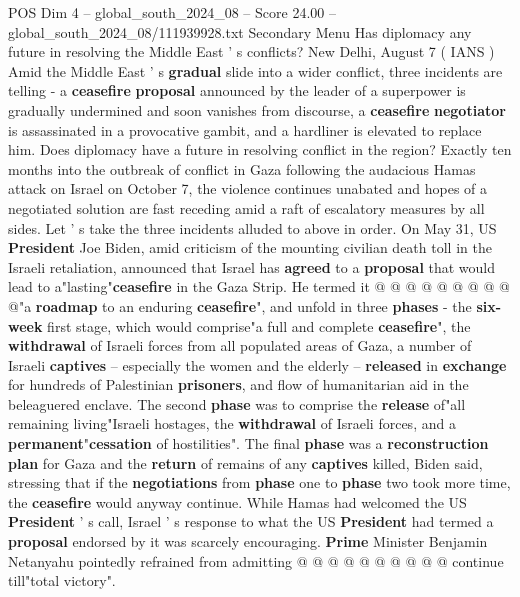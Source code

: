 \begin{textsample}{POS Dim 4 – global\_south\_2024\_08 – Score 24.00 – global\_south\_2024\_08/111939928.txt}  \label{ex:f4_pos_122}
Secondary Menu Has diplomacy any future in resolving the Middle East ' s conflicts?
New Delhi, August 7 ( IANS ) Amid the Middle East ' s \textbf{gradual} slide into a wider conflict, three incidents are telling - a \textbf{ceasefire} \textbf{proposal} announced by the leader of a superpower is gradually undermined and soon vanishes from discourse, a \textbf{ceasefire} \textbf{negotiator} is assassinated in a provocative gambit, and a hardliner is elevated to replace him.
Does diplomacy have a future in resolving conflict in the region?
Exactly ten months into the outbreak of conflict in Gaza following the audacious Hamas attack on Israel on October 7, the violence continues unabated and hopes of a negotiated solution are fast receding amid a raft of escalatory measures by all sides.
Let ' s take the three incidents alluded to above in order.
On May 31, US \textbf{President} Joe Biden, amid criticism of the mounting civilian death toll in the Israeli retaliation, announced that Israel has \textbf{agreed} to a \textbf{proposal} that would lead to a"lasting"\textbf{ceasefire} in the Gaza Strip.
He termed it @ @ @ @ @ @ @ @ @ @"a \textbf{roadmap} to an enduring \textbf{ceasefire}", and unfold in three \textbf{phases} - the \textbf{six-week} first stage, which would comprise"a full and complete \textbf{ceasefire}", the \textbf{withdrawal} of Israeli forces from all populated areas of Gaza, a number of Israeli \textbf{captives} -- especially the women and the elderly -- \textbf{released} in \textbf{exchange} for hundreds of Palestinian \textbf{prisoners}, and flow of humanitarian aid in the beleaguered enclave.
The second \textbf{phase} was to comprise the \textbf{release} of"all remaining living"Israeli hostages, the \textbf{withdrawal} of Israeli forces, and a \textbf{permanent}"\textbf{cessation} of hostilities".
The final \textbf{phase} was a \textbf{reconstruction} \textbf{plan} for Gaza and the \textbf{return} of remains of any \textbf{captives} killed, Biden said, stressing that if the \textbf{negotiations} from \textbf{phase} one to \textbf{phase} two took more time, the \textbf{ceasefire} would anyway continue.
While Hamas had welcomed the US \textbf{President} ' s call, Israel ' s response to what the US \textbf{President} had termed a \textbf{proposal} endorsed by it was scarcely encouraging. \textbf{Prime} Minister Benjamin Netanyahu pointedly refrained from admitting @ @ @ @ @ @ @ @ @ @ continue till"total victory".

\end{textsample}
